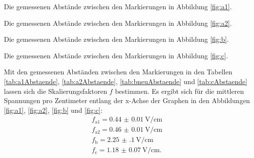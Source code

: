 \begin{center}
	\begin{table}
		\begin{minipage}[t]{0.5\textwidth}
			\caption{Die gemessenen Abstände zwischen den Markierungen in Abbildung \ref{fig:a1}.}
			\centering
			
		\end{minipage}
		\begin{minipage}[t]{0.5\textwidth}
			\caption{Die gemessenen Abstände zwischen den Markierungen in Abbildung \ref{fig:a2}.}
			\centering
			
		\end{minipage}
	\end{table}
\end{center}
\begin{center}
	\begin{table}
		\begin{minipage}[t]{0.5\textwidth}
			\caption{Die gemessenen Abstände zwischen den Markierungen in Abbildung \ref{fig:b}.}
			\centering
			
		\end{minipage}
		\begin{minipage}[t]{0.5\textwidth}
			\caption{Die gemessenen Abstände zwischen den Markierungen in Abbildung \ref{fig:c}.}
			\centering
			
		\end{minipage}
	\end{table}
\end{center}
Mit den gemessenen Abständen zwischen den Markierungen in den Tabellen \ref{tab:a1Abstaende}, \ref{tab:a2Abstaende}, \ref{tab:bneuAbstaende} und \ref{tab:cAbstaende} lassen sich die Skalierungsfaktoren $f$ bestimmen.
Es ergibt sich für die mittleren Spannungen pro Zentimeter entlang der x-Achse der Graphen in den Abbildungen \ref{fig:a1}, \ref{fig:a2}, \ref{fig:b} und \ref{fig:c}:
\begin{gather*}
	f_\text{a1}=\SI{0.44(1)}{\volt\per\centi\meter}\\
	f_\text{a2}=\SI{0.46(1)}{\volt\per\centi\meter}\\
	f_\text{b}=\SI{2.25(10)}{\volt\per\centi\meter}\\
	f_\text{c}=\SI{1.18(7)}{\volt\per\centi\meter}\text{.}
\end{gather*}


